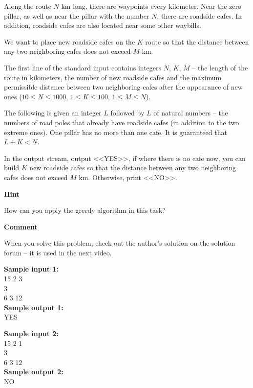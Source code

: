 \documentclass[a4paper]{article}
\begin{document}
Along the route $N$ km long, there are waypoints every kilometer. Near the zero pillar, as well as near the pillar with the number $N$, there are roadside cafes. In addition, roadside cafes are also located near some other waybills.

We want to place new roadside cafes on the $K$ route so that the distance between any two neighboring cafes does not exceed $M$ km.

The first line of the standard input contains integers $N$, $K$, $M$ -- the length of the route in kilometers, the number of new roadside cafes and the maximum permissible distance between two neighboring cafes after the appearance of new ones ($10 \le N \le 1000$, $1 \le K \le 100$, $1 \le M \le N$). 

The following is given an integer $L$ followed by $L$ of natural numbers -- the numbers of road poles that already have roadside cafes (in addition to the two extreme ones). One pillar has no more than one cafe. It is guaranteed that $L + K < N$.

In the output stream, output <<YES>>, if where there is no cafe now, you can build $K$ new roadside cafes so that the distance between any two neighboring cafes does not exceed $M$ km. Otherwise, print <<NO>>.

\SPACE

\textbf{Hint}

How can you apply the greedy algorithm in this task?

\SPACE

\textbf{Comment}

When you solve this problem, check out the author's solution on the solution forum -- it is used in the next video.


\LINE

\noindent \textbf{Sample input 1:}\\
15 2 3\\
3\\
6 3 12\\

\noindent \textbf{Sample output 1:}\\
YES

\SPACE

\noindent \textbf{Sample input 2:}\\
15 2 1\\
3\\
6 3 12\\

\noindent \textbf{Sample output 2:}\\
NO
\end{document}
